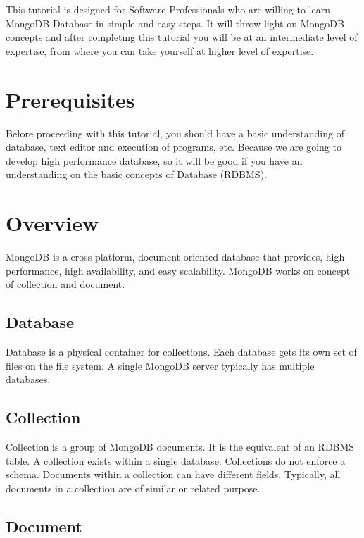 \documentclass[12pt]{article}
\begin{document}
This tutorial is designed for Software Professionals who are willing to
learn MongoDB Database in simple and easy steps. It will throw light on
MongoDB concepts and after completing this tutorial you will be at an
intermediate level of expertise, from where you can take yourself at
higher level of expertise.

\newpage
\section{Prerequisites}

Before proceeding with this tutorial, you should have a basic
understanding of database, text editor and execution of programs, etc.
Because we are going to develop high performance database, so it will be
good if you have an understanding on the basic concepts of Database
(RDBMS).

\newpage

\section{Overview}

MongoDB is a cross-platform, document oriented database that provides,
high performance, high availability, and easy scalability. MongoDB works
on concept of collection and document.

\subsection{Database}

Database is a physical container for collections. Each database gets its
own set of files on the file system. A single MongoDB server typically
has multiple databases.

\subsection{Collection}

Collection is a group of MongoDB documents. It is the equivalent of an
RDBMS table. A collection exists within a single database. Collections
do not enforce a schema. Documents within a collection can have
different fields. Typically, all documents in a collection are of
similar or related purpose.

\subsection{Document}
\end{document}
